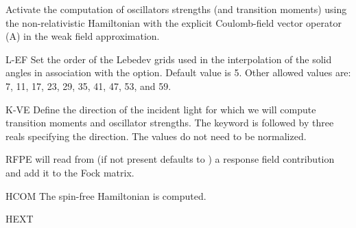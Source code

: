 \begin{keywordlist}
Activate the computation of oscillators strengths (and transition moments) using the
non-relativistic Hamiltonian with the explicit Coulomb-field vector operator (A) in
the weak field approximation.
\item[L-EF]
Set the order of the Lebedev grids used in the interpolation of the solid angles
in association with the  option. Default value is 5.
Other allowed values are: 7, 11, 17, 23, 29, 35, 41, 47, 53, and 59.
\item[K-VE]
Define the direction of the incident light for which we will
compute transition moments and oscillator strengths. The keyword
is followed by three reals specifying the direction. The values
do not need to be normalized.
\item[RFPE]
 will read from  (if not present defaults to )  a response field contribution
and add it to the Fock matrix.
\item[HCOM]
The spin-free Hamiltonian is computed.
\item[HEXT]

\end{keywordlist}
